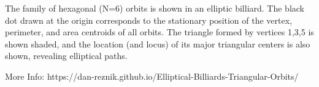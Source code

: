 The family of hexagonal (N=6) orbits is shown in an elliptic billiard. The black dot drawn at the origin corresponds to the stationary position of the vertex, perimeter, and area centroids of all orbits. The triangle formed by vertices 1,3,5 is shown shaded, and the location (and locus) of its major triangular centers is also shown, revealing elliptical paths.

More Info: https://dan-reznik.github.io/Elliptical-Billiards-Triangular-Orbits/